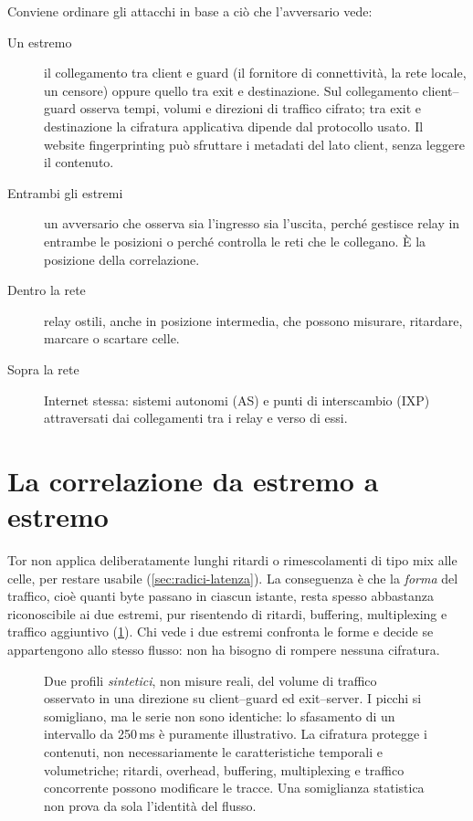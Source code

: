 Conviene ordinare gli attacchi in base a ciò che l'avversario vede:
\begin{description}
  \item[Un estremo] il collegamento tra client e guard (il fornitore di connettività, la rete locale, un censore) oppure quello tra exit e destinazione. Sul collegamento client--guard osserva tempi, volumi e direzioni di traffico cifrato; tra exit e destinazione la cifratura applicativa dipende dal protocollo usato. Il website fingerprinting può sfruttare i metadati del lato client, senza leggere il contenuto.
  \item[Entrambi gli estremi] un avversario che osserva sia l'ingresso sia l'uscita, perché gestisce relay in entrambe le posizioni o perché controlla le reti che le collegano. È la posizione della correlazione.
  \item[Dentro la rete] relay ostili, anche in posizione intermedia, che possono misurare, ritardare, marcare o scartare celle.
  \item[Sopra la rete] Internet stessa: sistemi autonomi (AS) e punti di interscambio (IXP) attraversati dai collegamenti tra i relay e verso di essi.
\end{description}

\section{La correlazione da estremo a estremo}\label{sec:att-correlazione}

Tor non applica deliberatamente lunghi ritardi o rimescolamenti di tipo mix alle celle, per restare usabile (\cref{sec:radici-latenza}). La conseguenza è che la \emph{forma} del traffico, cioè quanti byte passano in ciascun istante, resta spesso abbastanza riconoscibile ai due estremi, pur risentendo di ritardi, buffering, multiplexing e traffico aggiuntivo (\cref{fig:correlazione}). Chi vede i due estremi confronta le forme e decide se appartengono allo stesso flusso: non ha bisogno di rompere nessuna cifratura.

\begin{figure}[htbp]
\centering

\caption{Due profili \emph{sintetici}, non misure reali, del volume di traffico osservato in una direzione su client--guard ed exit--server. I picchi si somigliano, ma le serie non sono identiche: lo sfasamento di un intervallo da 250\,ms è puramente illustrativo. La cifratura protegge i contenuti, non necessariamente le caratteristiche temporali e volumetriche; ritardi, overhead, buffering, multiplexing e traffico concorrente possono modificare le tracce. Una somiglianza statistica non prova da sola l'identità del flusso.}
\label{fig:correlazione}
\end{figure}

